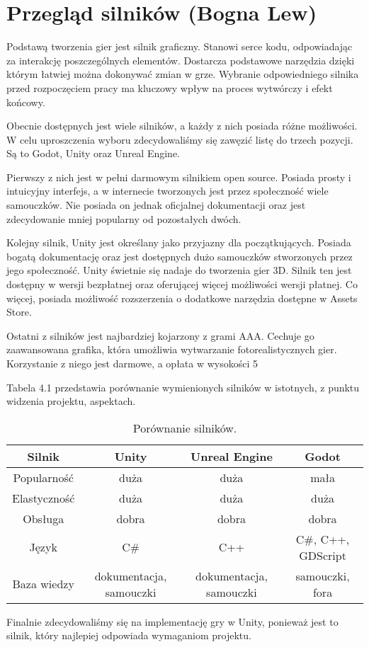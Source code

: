 \section{Przegląd silników (Bogna Lew)}
Podstawą tworzenia gier jest silnik graficzny. Stanowi serce kodu, odpowiadając za interakcję poszczególnych elementów. Dostarcza podstawowe narzędzia dzięki którym łatwiej można dokonywać zmian w grze. Wybranie odpowiedniego silnika przed rozpoczęciem pracy ma kluczowy wpływ na proces wytwórczy i efekt końcowy.

Obecnie dostępnych jest wiele silników, a każdy z nich posiada różne możliwości. W celu uproszczenia wyboru zdecydowaliśmy się zawęzić listę do trzech pozycji. Są to Godot, Unity oraz Unreal Engine.

Pierwszy z nich jest w pełni darmowym silnikiem open source. Posiada prosty i intuicyjny interfejs, a w internecie tworzonych jest przez społeczność wiele samouczków. Nie posiada on jednak oficjalnej dokumentacji oraz jest zdecydowanie mniej popularny od pozostałych dwóch.

Kolejny silnik, Unity jest określany jako przyjazny dla początkujących. Posiada bogatą dokumentację oraz jest dostępnych dużo samouczków stworzonych przez jego społeczność. Unity świetnie się nadaje do tworzenia gier 3D. Silnik ten jest dostępny w wersji bezpłatnej oraz oferującej więcej możliwości wersji płatnej. Co więcej, posiada możliwość rozszerzenia o dodatkowe narzędzia dostępne w Assets Store.

Ostatni z silników jest najbardziej kojarzony z grami AAA. Cechuje go zaawansowana grafika, która umożliwia wytwarzanie fotorealistycznych gier. Korzystanie z niego jest darmowe, a opłata w wysokości 5%

Tabela 4.1 przedstawia porównanie wymienionych silników w istotnych, z punktu widzenia projektu, aspektach.

\begin{table}[h]
\begin{center}
\begin{tabular}{ |c||c|c|c| }
 \hline
 Silnik & Unity & Unreal Engine & Godot \\
 \hline \hline
 Popularność & duża & duża & mała \\
 \hline
 Elastyczność & duża & duża & duża \\
 \hline
 Obsługa & dobra & dobra & dobra \\
 \hline
 Język & C\# & C++ & C\#, C++, GDScript \\
 \hline
 Baza wiedzy & dokumentacja,  samouczki & dokumentacja, samouczki & samouczki, fora \\
 \hline
\end{tabular}
\end{center}
\caption{Porównanie silników.}
\end{table}

Finalnie zdecydowaliśmy się na implementację gry w Unity, ponieważ jest to silnik, który najlepiej odpowiada wymaganiom projektu.
